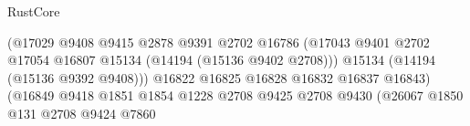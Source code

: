 \begin{lexlean}{RustCore}
\begin{coremodule}
                                                              (@17029
                                                                @9408
                                                                @9415
                                                                @2878
                                                                @9391
                                                                @2702
                                                                @16786
                                                                (@17043
                                                                  @9401
                                                                  @2702
                                                                  @17054
                                                                  @16807
                                                                  @15134
                                                                  (@14194 (@15136 @9402 @2708)))
                                                                @15134
                                                                (@14194 (@15136 @9392 @9408)))
                                                              @16822
                                                              @16825
                                                              @16828
                                                              @16832
                                                              @16837
                                                              @16843)
                                                            (@16849
                                                              @9418
                                                              @1851
                                                              @1854
                                                              @1228
                                                              @2708
                                                              @9425
                                                              @2708
                                                              @9430
                                                              (@26067
                                                                @1850
                                                                @131
                                                                @2708
                                                                @9424
                                                                @7860

\end{coremodule}
\end{lexlean}

